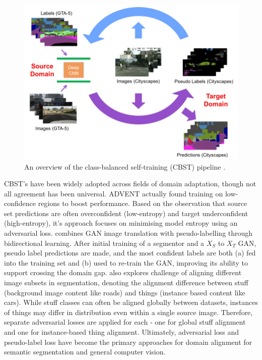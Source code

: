 \documentclass[a4paper,12pt]{report}
\begin{document}
    \begin{figure}[t]
        \centering
        \includegraphics[scale=0.7]{res/cbst-overview.png}
        \caption{An overview of the class-balanced self-training (CBST) pipeline \cite{zou_domain_2018}.}
        \label{fig:cbst_overview}
    \end{figure}

    CBST’s have been widely adopted across fields of domain adaptation, though not all agreement has been universal. ADVENT \cite{vu_advent_2019} actually found training on low-confidence regions to boost performance. Based on the observation that source set predictions are often overconfident (low-entropy) and target underconfident (high-entropy), it’s approach focuses on minimising model entropy using an adversarial loss. \cite{li_bidirectional_2019} combines GAN image translation with pseudo-labelling through bidirectional learning. After initial training of a segmentor and a $X_S$ to $X_T$ GAN, pseudo label predictions are made, and the most confident labels are both (a) fed into the training set and (b) used to re-train the GAN, improving its ability to support crossing the domain gap. \cite{wang_differential_2020} also explores challenge of aligning different image subsets in segmentation, denoting the alignment difference between stuff (background image content like roads) and things (instance based content like cars). While stuff classes can often be aligned globally between datasets, instances of things may differ in distribution even within a single source image. Therefore, separate adversarial losses are applied for each - one for global stuff alignment and one for instance-based thing alignment. Ultimately, adversarial loss and pseudo-label loss have become the primary approaches for domain alignment for semantic segmentation and general computer vision.
    
\end{document}
